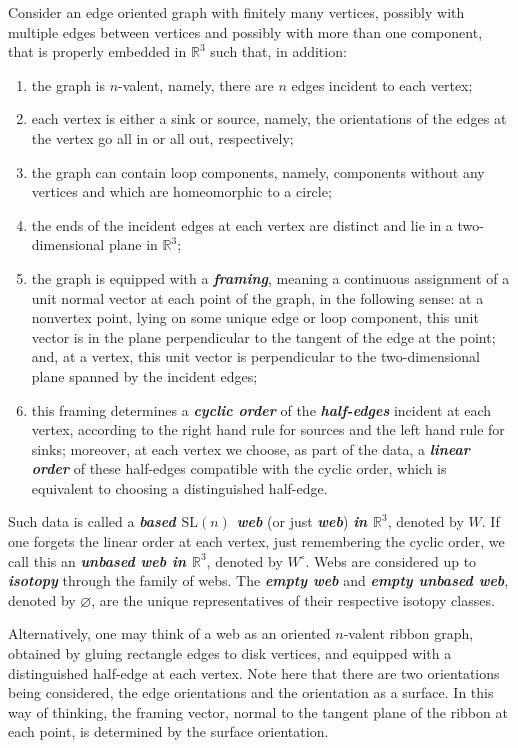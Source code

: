 \documentclass[12pt,
	]{amsart}
\theoremstyle{definition}
\renewcommand{\emptyset}{\varnothing}
\newcommand{\mrm}[1]{\mathrm{#1}}
\newcommand{\mbb}[1]{\mathbb{#1}}
\newcommand{\define}[1]{{\textit{\textbf{#1}}}}
\newcommand{\unbased}[1]{#1^\circ}
\newcommand{\R}{\mbb{R}}
\newcommand{\threereal}{\R^3}
\newcommand{\nsl}{\mrm{SL}(n)}
\begin{document}
Consider an edge oriented graph with finitely many vertices, possibly with multiple edges between vertices and possibly with more than one component, that is properly embedded in $\threereal$ such that, in addition:
\begin{enumerate}
\item  the graph is $n$-valent, namely, there are $n$ edges incident to each vertex;
\item  each vertex is either a sink or source, namely, the orientations of the edges at the vertex go all in or all out, respectively;
\item  the graph can contain loop components, namely, components without any vertices and which are homeomorphic to a circle;
\item  the ends of the incident edges at each vertex are distinct and lie in a two-dimensional plane in $\threereal$;
\item  the graph is equipped with a \define{framing}, meaning a continuous assignment of a unit normal vector at each point of the graph, in the following sense:  at a nonvertex point, lying on some unique edge or loop component, this unit vector is in the plane perpendicular to the tangent of the edge at the point; and, at a vertex, this unit vector is perpendicular to the two-dimensional plane spanned by the incident edges;
\item  this framing determines a \define{cyclic order} of the \define{half-edges} incident at each vertex, according to the right hand rule for sources and the left hand rule for sinks; moreover, at each vertex we choose, as part of the data, a \define{linear order} of these half-edges compatible with the cyclic order, which is equivalent to choosing a distinguished half-edge.
\end{enumerate}
Such data is called a \define{based $\nsl$ web} (or just \define{web}) \define{in $\threereal$}, denoted by $W$.   If one forgets the linear order at each vertex, just remembering the cyclic order, we call this an \define{unbased web in $\threereal$}, denoted by $\unbased{W}$.  Webs are considered up to \define{isotopy} through the family of webs.  The \define{empty web} and \define{empty unbased web}, denoted by $\emptyset$, are the unique representatives of their respective isotopy classes.  

Alternatively, one may think of a web as an oriented $n$-valent ribbon graph, obtained by gluing rectangle edges to disk vertices, and equipped with a distinguished half-edge at each vertex.  Note here that there are two orientations being considered, the edge orientations and the orientation as a surface.  In this way of thinking, the framing vector, normal to the tangent plane of the ribbon at each point, is determined by the surface orientation.
\end{document}
